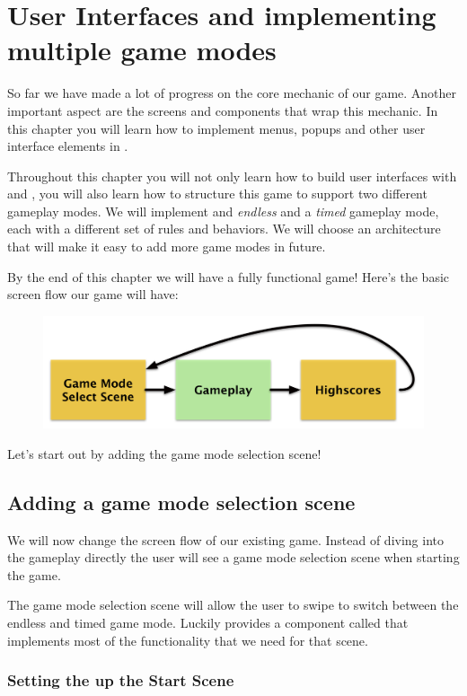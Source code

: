 \chapter{User Interfaces and implementing multiple game modes}

So far we have made a lot of progress on the core mechanic of our game. Another
important aspect are the screens and components that wrap this mechanic. In this chapter
you will learn how to implement menus, popups and other user interface elements
in \cocos{}. 

Throughout this chapter you will not only learn how to build user interfaces
with \cocos{} and \SB{}, you will also learn how to structure this game to
support two different gameplay modes. We will implement and \textit{endless} and
a \textit{timed} gameplay mode, each with a different set of rules and
behaviors. We will choose an architecture that will make it easy to add more
game modes in future.

By the end of this chapter we will have a fully functional game!
Here's the basic screen flow our game will have:

\begin{figure}[H]
		\centering
		\includegraphics[width=0.7\linewidth]{images/Chapter6/screen_flow.png}
\end{figure}

Let's start out by adding the game mode selection scene!

\section{Adding a game mode selection scene}
We will now change the screen flow of our existing game. Instead of diving into
the gameplay directly the user will see a game mode selection scene when
starting the game. 

The game mode selection scene will allow the user to swipe to switch between the
endless and timed game mode. Luckily \cocos{} provides a component called
 that implements
most of the functionality that we need for that scene.

\subsection{Setting the up the Start Scene}

